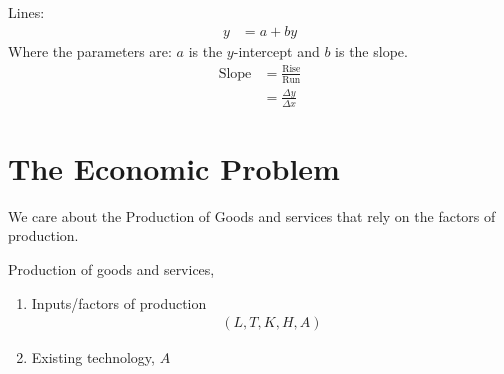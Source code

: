                     Lines:
                    \begin{align*}
                        y &= a + by
                    \end{align*}
                    Where the parameters are: $a$ is the $y$-intercept and $b$ is the slope.
                    \begin{align*}
                        \text{Slope} &= \frac{\text{Rise}}{\text{Run}} \\
                                     &= \frac{\Delta y}{\Delta x}
                    \end{align*}

        \chapter{The Economic Problem} %
        \label{cha:the_economic_problem}
            We care about the Production of Goods and services that rely on the factors of production.

            Production of goods and services,
            \begin{enumerate}
                \item Inputs/factors of production
                    \begin{align*}
                        ( L, T, K, H, A)
                    \end{align*}
                \item Existing technology, $A$
            \end{enumerate}

